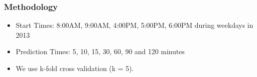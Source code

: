 \documentclass[t]{beamer}
\begin{document}
\begin{frame}\frametitle{Methodology}
\begin{itemize}
\item Start Times: 8:00AM, 9:00AM, 4:00PM, 5:00PM, 6:00PM during weekdays in 2013\\
\item<3-> Prediction Times: 5, 10, 15, 30, 60, 90 and 120 minutes
\item<4-> We use k-fold cross validation (k = 5).
\end{itemize}

\end{frame}
\end{document}
